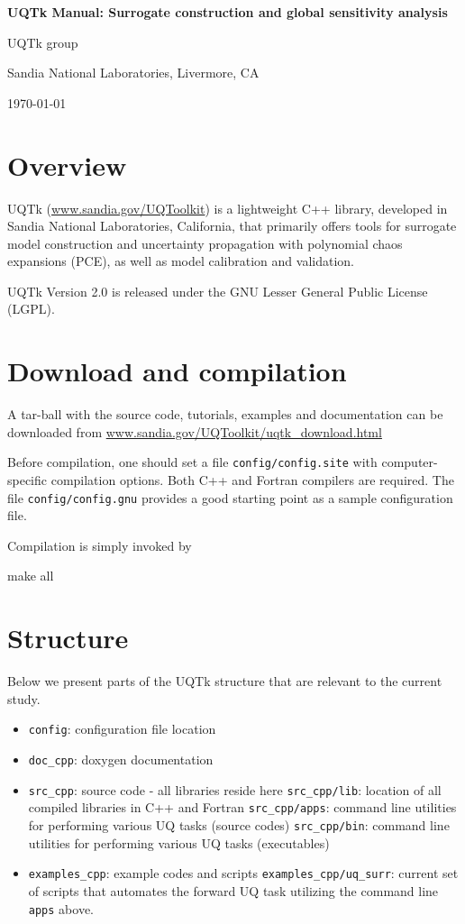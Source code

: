 \documentclass[12pt]{article}
\begin{document}
\centerline{\Large\bf UQTk Manual: Surrogate construction and global sensitivity analysis} 
\medskip
\centerline{UQTk group}
\centerline{Sandia National Laboratories, Livermore, CA}
\centerline{\today}
\medskip


\section{Overview}
\label{sec:uqoverview}
UQTk (\url{www.sandia.gov/UQToolkit}) is a lightweight C++ library, developed in Sandia National Laboratories, California, 
that primarily offers tools for surrogate model construction and uncertainty propagation with 
polynomial chaos expansions (PCE), as well as model calibration and validation.

UQTk Version 2.0 is released under the GNU Lesser General Public License (LGPL). 

\section{Download and compilation}
\label{sec:uqdownload}

A tar-ball with the source code, tutorials, examples and documentation can be 
downloaded from \url{www.sandia.gov/UQToolkit/uqtk\_download.html}

Before compilation, one should set a file \texttt{config/config.site} with computer-specific compilation options. 
Both C++ and Fortran compilers are required. The file \texttt{config/config.gnu} provides a good 
starting point as a sample configuration file.

Compilation is simply invoked by 
\begin{ShellCmd}
make all
\end{ShellCmd}


\section{Structure}
\label{sec:uqstruct}

Below we present parts of the UQTk structure that are relevant to the current study.

\begin{itemize}
\item \texttt{config}: configuration file location
\item \texttt{doc\_cpp}: doxygen documentation
\item \texttt{src\_cpp}: source code - all libraries reside here
\subitem \texttt{src\_cpp/lib}: location of all compiled libraries in C++ and Fortran
\subitem \texttt{src\_cpp/apps}: command line utilities for performing various UQ tasks (source codes)
\subitem \texttt{src\_cpp/bin}: command line utilities for performing various UQ tasks (executables)
\item \texttt{examples\_cpp}: example codes and scripts
\subitem \texttt{examples\_cpp/uq\_surr}: current set of scripts that automates the forward UQ task utilizing the command line \texttt{apps} above.
\end{itemize}
\end{document}
